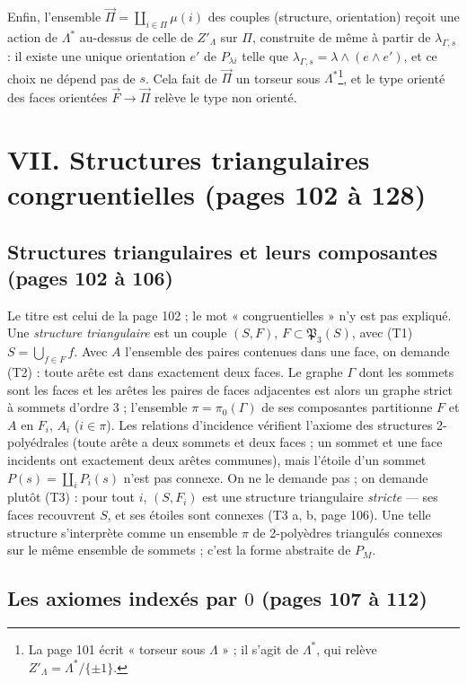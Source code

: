 \documentclass[11pt,a4paper]{article}
\begin{document}
Enfin, l'ensemble $\overrightarrow{\Pi} = \coprod_{i \in \Pi} \mu(i)$ des
couples (structure, orientation) reçoit une action de $\Lambda^{*}$ au-dessus
de celle de $Z'_\Lambda$ sur $\Pi$, construite de même à partir de
$\lambda_{\Gamma, s}$ : il existe une unique orientation $e'$ de $P_{\lambda i}$
telle que $\lambda_{\Gamma, s} = \lambda \wedge (e \wedge e')$, et ce choix ne
dépend pas de $s$. Cela fait de $\overrightarrow{\Pi}$ un torseur sous
$\Lambda^{*}$\footnote{La page 101 écrit « torseur sous $\Lambda$ » ; il s'agit
de $\Lambda^{*}$, qui relève $Z'_\Lambda = \Lambda^{*}/\{\pm 1\}$.}, et le type
orienté des faces orientées $\overrightarrow{F} \to \overrightarrow{\Pi}$
relève le type non orienté.

\section*{VII. Structures triangulaires congruentielles (pages 102 à 128)}

\subsection*{Structures triangulaires et leurs composantes (pages 102 à 106)}

Le titre est celui de la page 102 ; le mot « congruentielles » n'y est pas
expliqué. Une \emph{structure triangulaire} est un couple $(S, F)$, $F \subset
\mathfrak{P}_3(S)$, avec (T1) $S = \bigcup_{f \in F} f$. Avec $A$ l'ensemble des
paires contenues dans une face, on demande (T2) : toute arête est dans
exactement deux faces. Le graphe $\Gamma$ dont les sommets sont les faces et
les arêtes les paires de faces adjacentes est alors un graphe strict à sommets
d'ordre $3$ ; l'ensemble $\pi = \pi_0(\Gamma)$ de ses composantes partitionne
$F$ et $A$ en $F_i$, $A_i$ ($i \in \pi$). Les relations d'incidence vérifient
l'axiome des structures 2-polyédrales (toute arête a deux sommets et deux
faces ; un sommet et une face incidents ont exactement deux arêtes
communes), mais l'étoile d'un sommet $P(s) = \coprod_i P_i(s)$ n'est pas
connexe. On ne le demande pas ; on demande plutôt (T3) : pour tout $i$, $(S,
F_i)$ est une structure triangulaire \emph{stricte} --- ses faces recouvrent
$S$, et ses étoiles sont connexes (T3 a, b, page 106). Une telle structure
s'interprète comme un ensemble $\pi$ de 2-polyèdres triangulés connexes sur le
même ensemble de sommets ; c'est la forme abstraite de $P_M$.

\subsection*{Les axiomes indexés par $0$ (pages 107 à 112)}
\end{document}
